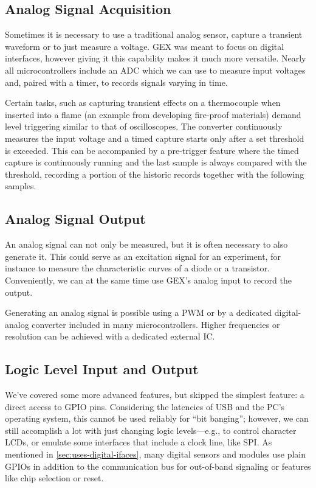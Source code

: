 \subsection{Analog Signal Acquisition}

Sometimes it is necessary to use a traditional analog sensor, capture a transient waveform or to just measure a voltage. GEX was meant to focus on digital interfaces, however giving it this capability makes it much more versatile. Nearly all microcontrollers include an \gls{ADC} which we can use to measure input voltages and, paired with a timer, to records signals varying in time.

Certain tasks, such as capturing transient effects on a thermocouple when inserted into a flame (an example from developing fire-proof materials) demand level triggering similar to that of oscilloscopes. The converter continuously measures the input voltage and a timed capture starts only after a set threshold is exceeded. This can be accompanied by a pre-trigger feature where the timed capture is continuously running and the last sample is always compared with the threshold, recording a portion of the historic records together with the following samples.

\subsection{Analog Signal Output}

An analog signal can not only be measured, but it is often necessary to also generate it. This could serve as an excitation signal for an experiment, for instance to measure the characteristic curves of a diode or a transistor. Conveniently, we can at the same time use GEX's analog input to record the output.

Generating an analog signal is possible using a \gls{PWM} or by a dedicated digital-analog converter included in many microcontrollers. Higher frequencies or resolution can be achieved with a dedicated external \gls{IC}.

\subsection{Logic Level Input and Output}

We've covered some more advanced features, but skipped the simplest feature: a direct access to \gls{GPIO} pins. Considering the latencies of \gls{USB} and the \gls{PC}'s operating system, this cannot be used reliably for ``bit banging''; however, we can still accomplish a lot with just changing logic levels---e.g., to control character \glspl{LCD}, or emulate some interfaces that include a clock line, like \gls{SPI}. As mentioned in \cref{sec:uses-digital-ifaces}, many digital sensors and modules use plain \glspl{GPIO} in addition to the communication bus for out-of-band signaling or features like chip selection or reset.

